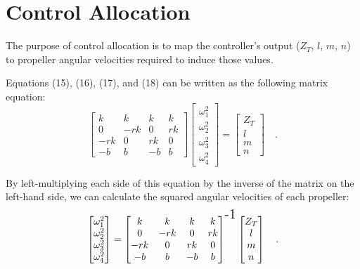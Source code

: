 \section*{Control Allocation}

The purpose of control allocation is to map the controller's output ($Z_T$, $l$, $m$, $n$) to propeller angular velocities required to induce those values.

Equations (15), (16), (17), and (18) can be written as the following matrix equation:
\begin{equation*}
    \begin{bmatrix}
        k & k & k & k \\ 
        0 & -rk & 0 & rk \\ 
        -rk & 0 & rk & 0 \\ 
        -b & b & -b & b
    \end{bmatrix}
    \begin{bmatrix}
        \omega_1^2 \\ 
        \omega_2^2 \\ 
        \omega_3^2 \\ 
        \omega_4^2
    \end{bmatrix}
    =
    \begin{bmatrix}
        Z_T \\ 
        l \\ 
        m \\ 
        n
    \end{bmatrix} \quad .
\end{equation*}

By left-multiplying each side of this equation by the inverse of the matrix on the left-hand side, we can calculate the squared angular velocities of each propeller:
\begin{equation}
    \begin{bmatrix}
        \omega_1^2 \\ 
        \omega_2^2 \\ 
        \omega_3^2 \\ 
        \omega_4^2
    \end{bmatrix}
    = 
    \begin{bmatrix}
        k & k & k & k \\ 
        0 & -rk & 0 & rk \\ 
        -rk & 0 & rk & 0 \\ 
        -b & b & -b & b
    \end{bmatrix}^{\text{\Large -1}}
    \begin{bmatrix}
        Z_T \\ 
        l \\ 
        m \\ 
        n
    \end{bmatrix} \quad .
\end{equation}

